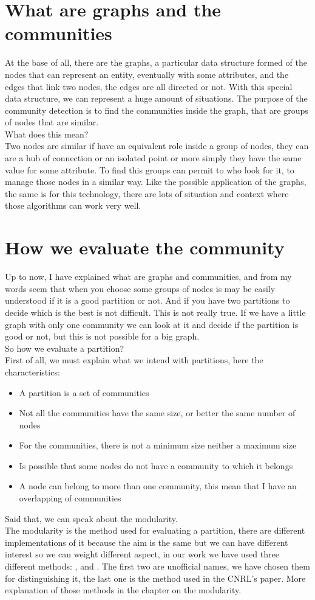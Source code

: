 \section{What are graphs and the communities}
At the base of all, there are the graphs, a particular data structure formed of the nodes that can represent an entity, eventually with some attributes, and the edges that link two nodes, the edges are all directed or not. With this special data structure, we can represent a huge amount of situations. The purpose of the community detection is to find the communities inside the graph, that are groups of nodes that are similar.\\
What does this mean?\\
Two nodes are similar if have an equivalent role inside a group of nodes, they can are a hub of connection or an isolated point or more simply they have the same value for some attribute. To find this groups can permit to who look for it, to manage those nodes in a similar way. Like the possible application of the graphs, the same is for this technology, there are lots of situation and context where those algorithms can work very well.
%
\section{How we evaluate the community}
Up to now, I have explained what are graphs and communities, and from my words seem that when you choose some groups of nodes is may be easily understood if it is a good partition or not. And if you have two partitions to decide which is the best is not difficult. This is not really true. If we have a little graph with only one community we can look at it and decide if the partition is good or not, but this is not possible for a big graph.\\
So how we evaluate a partition?\\
First of all, we must explain what we intend with partitions, here the characteristics:
\begin{itemize}
	\item A partition is a set of communities
	\item Not all the communities have the same size, or better the same number of nodes
	\item For the communities, there is not a minimum size neither a maximum size
	\item Is possible that some nodes do not have a community to which it belongs
	\item A node can belong to more than one community, this mean that I have an overlapping of communities
\end{itemize}
Said that, we can speak about the modularity.\\
The modularity is the method used for evaluating a partition, there are different implementations of it because the aim is the same but we can have different interest so we can weight different aspect, in our work we have used three different methods: \mmax, \mover and \mmod . The first two are unofficial names, we have chosen them for distinguishing it, the last one is the method used in the CNRL's paper. More explanation of those methods in the chapter on the modularity.
%
